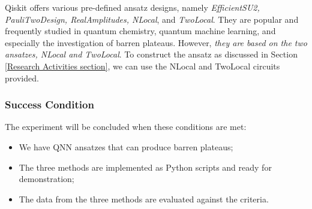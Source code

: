 Qiskit offers various pre-defined ansatz designs, namely \textit{EfficientSU2, PauliTwoDesign, RealAmplitudes, NLocal}, and \textit{TwoLocal}.
They are popular and frequently studied in quantum chemistry, quantum machine learning, and especially the investigation of barren plateaus.
However, \emph{they are based on the two ansatzes, NLocal and TwoLocal}.
To construct the ansatz as discussed in Section \ref{Research Activities section}, we can use the NLocal and TwoLocal circuits provided.


\subsubsection{Success Condition}
The experiment will be concluded when these conditions are met:
\begin{itemize}
    \item We have QNN ansatzes that can produce barren plateaus;
    \item The three methods are implemented as Python scripts and ready for demonstration;
    \item The data from the three methods are evaluated against the criteria.
\end{itemize}